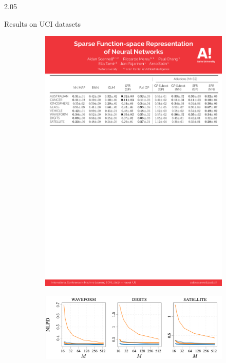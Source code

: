 \documentclass[final,12pt]{beamer}
\newlength{\colwidth}
\begin{document}
\begin{frame}[t]
\begin{columns}
\begin{column}{2.05\colwidth}
\begin{block}{Results on UCI datasets}
\begin{figure}
\centering
\begin{subfigure}[b]{0.5\textwidth}\centering
	\includegraphics[scale=0.5]{fig/table.pdf}	
\end{subfigure}\hspace{2cm}
\begin{subfigure}[b]{0.3\textwidth}\centering
	\includegraphics[scale=0.2]{fig/nlpd.pdf}

\end{subfigure}
\end{figure}
\end{block}
\end{column}
\end{columns}
\end{frame}
\end{document}

